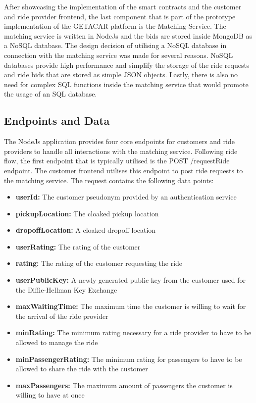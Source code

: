 After showcasing the implementation of the smart contracts and the customer and ride provider frontend, the last component that is part of the prototype implementation of the GETACAR platform is the Matching Service. The matching service is written in NodeJs and the bids are stored inside MongoDB as a NoSQL database. The design decision of utilising a NoSQL database in connection with the matching service was made for several reasons. NoSQL databases provide high performance and simplify the storage of the ride requests and ride bids that are stored as simple JSON objects. Lastly, there is also no need for complex SQL functions inside the matching service that would promote the usage of an SQL database.


\subsection{Endpoints and Data}
The NodeJs application provides four core endpoints for customers and ride providers to handle all interactions with the matching service. Following ride flow, the first endpoint that is typically utilised is the POST /requestRide endpoint. The customer frontend utilises this endpoint to post ride requests to the matching service. The request contains the following data points:

\begin{itemize}
    \item \textbf{userId:} The customer pseudonym provided by an authentication service
    \item \textbf{pickupLocation:} The cloaked pickup location
    \item \textbf{dropoffLocation:} A cloaked dropoff location
    \item \textbf{userRating:} The rating of the customer
    \item \textbf{rating:} The rating of the customer requesting the ride
    \item \textbf{userPublicKey:} A newly generated public key from the customer used for the Diffie-Hellman Key Exchange
    \item \textbf{maxWaitingTime:} The maximum time the customer is willing to wait for the arrival of the ride provider
    \item \textbf{minRating:} The minimum rating necessary for a ride provider to have to be allowed to manage the ride
    \item \textbf{minPassengerRating:} The minimum rating for passengers to have to be allowed to share the ride with the customer
    \item \textbf{maxPassengers:} The maximum amount of passengers the customer is willing to have at once
\end{itemize}

